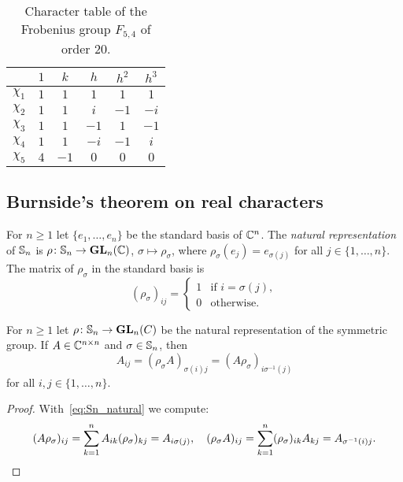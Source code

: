 \begin{table}[ht]
\caption{Character table of the Frobenius group $F_{5,4}$ of order $20$.}
\label{tab:F5,4}
        \begin{tabular}{|c|ccccc|}
             \hline
             & $1$ & $k$ & $h$ & $h^2$ & $h^3$\\
             \hline
             $\chi_1$ & $1$ & $1$ & $1$ & $1$ & $1$\\
             $\chi_2$ & $1$ & $1$ & $i$ & $-1$ & $-i$\\
             $\chi_3$ & $1$ & $1$ & $-1$ & $1$ & $-1$\\
             $\chi_4$ & $1$ & $1$ & $-i$ & $-1$ & $i$\\
             $\chi_5$ & $4$ & $-1$ & $0$ & $0$ & $0$\\
             \hline
        \end{tabular}
    \end{table} 

\subsection{Burnside's theorem on real characters}

For $n\geq1$ let $\{e_1,\dots,e_n\}$ be the standard basis of $\mathbb{C}^n$.  
The \emph{natural representation} of $\mathbb{S}_n$ is 
$\rho\colon\mathbb{S}_n\to\mathbf{GL}_n(\mathbb{C})$, $\sigma\mapsto\rho_{\sigma}$, 
where $\rho_\sigma(e_j)=e_{\sigma(j)}$ for all $j\in\{1,\dots,n\}$. 
The matrix of $\rho_\sigma$ in the standard basis is  
\begin{equation}
    \label{eq:Sn_natural}
    (\rho_\sigma)_{ij}=\begin{cases}
      1 & \text{if $i=\sigma(j)$},\\
      0 & \text{otherwise}.
    \end{cases}
\end{equation}

\begin{lemma}
	\label{lem:permutaciones}
	For $n\geq1$ let $\rho\colon\mathbb{S}_n\to\mathbf{GL}_n(C)$ be the natural 
	representation of the symmetric group. 
	If $A\in\mathbb{C}^{n\times n}$ and $\sigma\in\mathbb{S}_n$, then
	\[
		A_{ij}=(\rho_{\sigma}A)_{\sigma(i)j}=(A\rho_{\sigma})_{i\sigma^{-1}(j)}
	\]
    for all $i,j\in\{1,\dots,n\}$.
\end{lemma}

\begin{proof}
	With~\eqref{eq:Sn_natural} we compute:
	\[
		(A\rho_{\sigma})_{ij}=\sum_{k=1}^n A_{ik}(\rho_{\sigma})_{kj}=A_{i\sigma(j)},
		\quad
		(\rho_\sigma A)_{ij}=\sum_{k=1}^n (\rho_\sigma)_{ik}A_{kj}=A_{\sigma^{-1}(i)j}.\qedhere
	\]
\end{proof}

